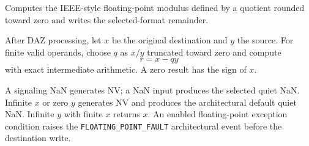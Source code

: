 Computes the IEEE-style floating-point modulus defined by a quotient rounded toward zero and writes the selected-format remainder.

After DAZ processing, let \(x\) be the original destination and \(y\) the source. For finite valid operands, choose \(q\) as \(x/y\) truncated toward zero and compute
\[
  r = x - qy
\]
with exact intermediate arithmetic. A zero result has the sign of \(x\).

A signaling NaN generates NV; a NaN input produces the selected quiet NaN. Infinite \(x\) or zero \(y\) generates NV and produces the architectural default quiet NaN. Infinite \(y\) with finite \(x\) returns \(x\). An enabled floating-point exception condition raises the \texttt{FLOATING\_POINT\_FAULT} architectural event before the destination write.
